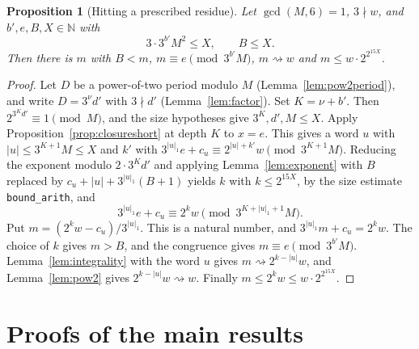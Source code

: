 \documentclass[11pt,reqno,oneside]{amsart}
\theoremstyle{plain}
\newtheorem{proposition}[theorem]{Proposition}
\theoremstyle{definition}
\numberwithin{equation}{section}
\newcommand{\lean}[1]{\texttt{#1}}
\begin{document}
\begin{proposition}[Hitting a prescribed residue]\label{prop:hit}
Let $\gcd(M,6)=1$, $3\nmid w$, and $b',e,B,X\in\mathbb N$ with
\[
3\cdot3^{b'}M^2\le X,\qquad B\le X.
\]
Then there is $m$ with $B<m$, $m\equiv e\pmod{3^{b'}M}$, $m\rightsquigarrow w$ and $m\le w\cdot2^{2^{15X}}$.
\end{proposition}
\begin{proof}
Let $D$ be a power-of-two period modulo $M$ (Lemma~\ref{lem:pow2period}), and write $D=3^\nu d'$ with $3\nmid d'$ (Lemma~\ref{lem:factor}). Set $K=\nu+b'$. Then $2^{3^Kd'}\equiv1\pmod M$, and the size hypotheses give $3^K,d',M\le X$. Apply Proposition~\ref{prop:closureshort} at depth $K$ to $x=e$. This gives a word $u$ with $|u|\le3^{K+1}M\le X$ and $k'$ with $3^{|u|_1}e+c_u\equiv2^{|u|+k'}w\pmod{3^{K+1}M}$. Reducing the exponent modulo $2\cdot3^Kd'$ and applying Lemma~\ref{lem:exponent} with $B$ replaced by $c_u+|u|+3^{|u|_1}(B+1)$ yields $k$ with $k\le2^{15X}$, by the size estimate \lean{bound\_arith}, and
\[
3^{|u|_1}e+c_u\equiv2^kw\pmod{3^{K+|u|_1+1}M}.
\]
Put $m=(2^kw-c_u)/3^{|u|_1}$. This is a natural number, and $3^{|u|_1}m+c_u=2^kw$. The choice of $k$ gives $m>B$, and the congruence gives $m\equiv e\pmod{3^{b'}M}$. Lemma~\ref{lem:integrality} with the word $u$ gives $m\rightsquigarrow2^{k-|u|}w$, and Lemma~\ref{lem:pow2} gives $2^{k-|u|}w\rightsquigarrow w$. Finally $m\le2^kw\le w\cdot2^{2^{15X}}$.
\end{proof}

\section{Proofs of the main results}\label{sec:proofs}
\end{document}
